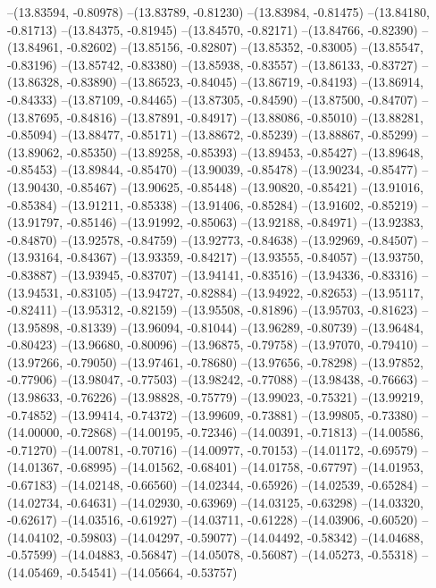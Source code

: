 --(13.83594, -0.80978)
--(13.83789, -0.81230)
--(13.83984, -0.81475)
--(13.84180, -0.81713)
--(13.84375, -0.81945)
--(13.84570, -0.82171)
--(13.84766, -0.82390)
--(13.84961, -0.82602)
--(13.85156, -0.82807)
--(13.85352, -0.83005)
--(13.85547, -0.83196)
--(13.85742, -0.83380)
--(13.85938, -0.83557)
--(13.86133, -0.83727)
--(13.86328, -0.83890)
--(13.86523, -0.84045)
--(13.86719, -0.84193)
--(13.86914, -0.84333)
--(13.87109, -0.84465)
--(13.87305, -0.84590)
--(13.87500, -0.84707)
--(13.87695, -0.84816)
--(13.87891, -0.84917)
--(13.88086, -0.85010)
--(13.88281, -0.85094)
--(13.88477, -0.85171)
--(13.88672, -0.85239)
--(13.88867, -0.85299)
--(13.89062, -0.85350)
--(13.89258, -0.85393)
--(13.89453, -0.85427)
--(13.89648, -0.85453)
--(13.89844, -0.85470)
--(13.90039, -0.85478)
--(13.90234, -0.85477)
--(13.90430, -0.85467)
--(13.90625, -0.85448)
--(13.90820, -0.85421)
--(13.91016, -0.85384)
--(13.91211, -0.85338)
--(13.91406, -0.85284)
--(13.91602, -0.85219)
--(13.91797, -0.85146)
--(13.91992, -0.85063)
--(13.92188, -0.84971)
--(13.92383, -0.84870)
--(13.92578, -0.84759)
--(13.92773, -0.84638)
--(13.92969, -0.84507)
--(13.93164, -0.84367)
--(13.93359, -0.84217)
--(13.93555, -0.84057)
--(13.93750, -0.83887)
--(13.93945, -0.83707)
--(13.94141, -0.83516)
--(13.94336, -0.83316)
--(13.94531, -0.83105)
--(13.94727, -0.82884)
--(13.94922, -0.82653)
--(13.95117, -0.82411)
--(13.95312, -0.82159)
--(13.95508, -0.81896)
--(13.95703, -0.81623)
--(13.95898, -0.81339)
--(13.96094, -0.81044)
--(13.96289, -0.80739)
--(13.96484, -0.80423)
--(13.96680, -0.80096)
--(13.96875, -0.79758)
--(13.97070, -0.79410)
--(13.97266, -0.79050)
--(13.97461, -0.78680)
--(13.97656, -0.78298)
--(13.97852, -0.77906)
--(13.98047, -0.77503)
--(13.98242, -0.77088)
--(13.98438, -0.76663)
--(13.98633, -0.76226)
--(13.98828, -0.75779)
--(13.99023, -0.75321)
--(13.99219, -0.74852)
--(13.99414, -0.74372)
--(13.99609, -0.73881)
--(13.99805, -0.73380)
--(14.00000, -0.72868)
--(14.00195, -0.72346)
--(14.00391, -0.71813)
--(14.00586, -0.71270)
--(14.00781, -0.70716)
--(14.00977, -0.70153)
--(14.01172, -0.69579)
--(14.01367, -0.68995)
--(14.01562, -0.68401)
--(14.01758, -0.67797)
--(14.01953, -0.67183)
--(14.02148, -0.66560)
--(14.02344, -0.65926)
--(14.02539, -0.65284)
--(14.02734, -0.64631)
--(14.02930, -0.63969)
--(14.03125, -0.63298)
--(14.03320, -0.62617)
--(14.03516, -0.61927)
--(14.03711, -0.61228)
--(14.03906, -0.60520)
--(14.04102, -0.59803)
--(14.04297, -0.59077)
--(14.04492, -0.58342)
--(14.04688, -0.57599)
--(14.04883, -0.56847)
--(14.05078, -0.56087)
--(14.05273, -0.55318)
--(14.05469, -0.54541)
--(14.05664, -0.53757)
